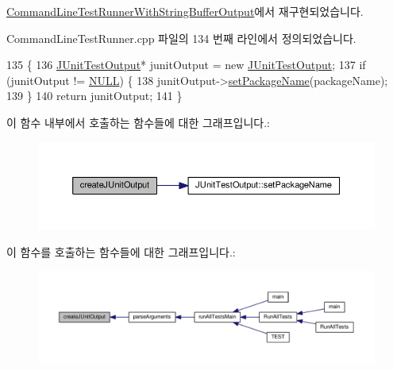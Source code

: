 \hyperlink{class_command_line_test_runner_with_string_buffer_output_a1e186370476e3953ab58a03788eb2ef4}{Command\+Line\+Test\+Runner\+With\+String\+Buffer\+Output}에서 재구현되었습니다.



Command\+Line\+Test\+Runner.\+cpp 파일의 134 번째 라인에서 정의되었습니다.


\begin{DoxyCode}
135 \{
136     \hyperlink{class_j_unit_test_output}{JUnitTestOutput}* junitOutput = \textcolor{keyword}{new} \hyperlink{class_j_unit_test_output}{JUnitTestOutput};
137     \textcolor{keywordflow}{if} (junitOutput != \hyperlink{openavb__types__base__pub_8h_a070d2ce7b6bb7e5c05602aa8c308d0c4}{NULL}) \{
138       junitOutput->\hyperlink{class_j_unit_test_output_a146d868bda2dda4264d6281db8c9ab21}{setPackageName}(packageName);
139     \}
140     \textcolor{keywordflow}{return} junitOutput;
141 \}
\end{DoxyCode}


이 함수 내부에서 호출하는 함수들에 대한 그래프입니다.\+:
\nopagebreak
\begin{figure}[H]
\begin{center}
\leavevmode
\includegraphics[width=350pt]{class_command_line_test_runner_a18fbb5d195f0ac88e30b3cb26c399adf_cgraph}
\end{center}
\end{figure}




이 함수를 호출하는 함수들에 대한 그래프입니다.\+:
\nopagebreak
\begin{figure}[H]
\begin{center}
\leavevmode
\includegraphics[width=350pt]{class_command_line_test_runner_a18fbb5d195f0ac88e30b3cb26c399adf_icgraph}
\end{center}
\end{figure}


